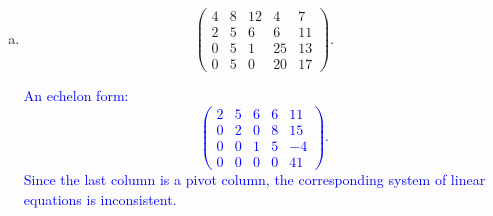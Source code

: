 \documentclass[a4paper,11pt]{article}
\newcommand{\BB}[1]{\textcolor{blue}{#1}}
\begin{document}
\begin{enumerate}[(a)]
\item
  \[
    \left(
      \begin{array}{cccc|c}
        4 & 8 & 12 & 4 & 7 \\
        2 & 5 & 6 & 6 & 11 \\
        0 & 5 & 1 & 25 & 13 \\
        0 & 5 & 0 & 20 & 17       
      \end{array}
    \right).
  \]

  \BB{
    An echelon form:
    \[
      \left(
        \begin{array}{cccc|c}
          2 & 5 & 6 & 6 & 11 \\
          0 & 2 & 0 & 8 & 15 \\
          0 & 0 & 1 & 5 & -4 \\
          0 & 0 & 0 & 0 & 41
        \end{array}
      \right).
    \]
    Since the last column is a pivot column, the corresponding system of linear
    equations is inconsistent. \\
  }
\end{enumerate}
\end{document}
